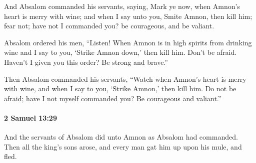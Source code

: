 			\begin{versebox}
					\item[BHS] 
					\item[ASV] And Absalom commanded his servants, saying, Mark ye now, when Amnon's heart is merry with wine; and when I say unto you, Smite Amnon, then kill him; fear not; have not I commanded you? be courageous, and be valiant.
					\item[NIV] Absalom ordered his men, “Listen! When Amnon is in high spirits from drinking wine and I say to you, ‘Strike Amnon down,’ then kill him. Don’t be afraid. Haven’t I given you this order? Be strong and brave.”
					\item[NRSV] Then Absalom commanded his servants, “Watch when Amnon’s heart is merry with wine, and when I say to you, ‘Strike Amnon,’ then kill him. Do not be afraid; have I not myself commanded you? Be courageous and valiant.”
			\end{versebox}

		\paragraph{2 Samuel 13:29} %
			\label{2SAMUEL-13-29}

			And the servants of Absalom did unto Amnon as Absalom had commanded. Then all the king’s sons arose, and every man gat him up upon his mule, and fled.

